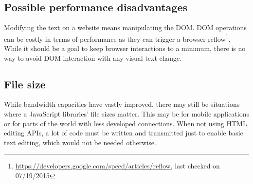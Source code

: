 
\subsection{Possible performance disadvantages}

Modifying the text on a website means manipulating the DOM. DOM operations can be costly in terms of performance as they can trigger a browser reflow\footnote{\url{https://developers.google.com/speed/articles/reflow}, last checked on 07/19/2015}. While it should be a goal to keep browser interactions to a minimum, there is no way to avoid DOM interaction with any visual text change.



\subsection{File size} While bandwidth capacities have vastly improved, there may still be situations where a JavaScript libraries' file sizes matter. This may be for mobile applications or for parts of the world with less developed connections. When not using HTML editing APIs, a lot of code must be written and transmitted just to enable basic text editing, which would not be needed otherwise.